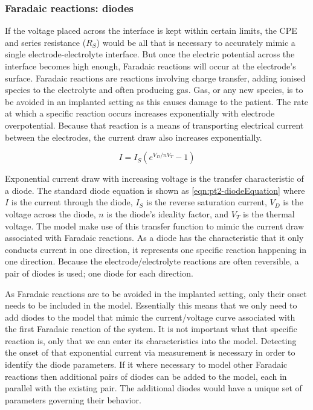     \subsubsection{Faradaic reactions: diodes}
      If the voltage placed across the interface is kept within certain limits, the CPE and series resistance ($R_{S}$) would be all that is necessary to accurately mimic a single electrode-electrolyte interface.
      But once the electric potential across the interface becomes high enough, Faradaic reactions will occur at the electrode's surface.
      Faradaic reactions are reactions involving charge transfer, adding ionised species to the electrolyte and often producing gas.
      Gas, or any new species, is to be avoided in an implanted setting as this causes damage to the patient.
      The rate at which a specific reaction occurs increases exponentially with electrode overpotential.
      Because that reaction is a means of transporting electrical current between the electrodes, the current draw also increases exponentially.

      \begin{equation}
        I = I_{S}\left( e^{V_{D}/n V_{T}} - 1\right)
        \label{eqn:pt2-diodeEquation}
      \end{equation}

      Exponential current draw with increasing voltage is the transfer characteristic of a diode.
      The standard diode equation is shown as \cref{eqn:pt2-diodeEquation} where $I$ is the current through the diode,
      $I_{S}$ is the reverse saturation current,
      $V_{D}$ is the voltage across the diode,
      $n$ is the diode's ideality factor,
      and $V_{T}$ is the thermal voltage.
      The model make use of this transfer function to mimic the current draw associated with Faradaic reactions.
      As a diode has the characteristic that it only conducts current in one direction, it represents one specific reaction happening in one direction.
      Because the electrode/electrolyte reactions are often reversible, a pair of diodes is used; one diode for each direction.

      As Faradaic reactions are to be avoided in the implanted setting, only their onset needs to be included in the model.
      Essentially this means that we only need to add diodes to the model that mimic the current/voltage curve associated with the first Faradaic reaction of the system.
      It is not important what that specific reaction is, only that we can enter its characteristics into the model.
      Detecting the onset of that exponential current via measurement is necessary in order to identify the diode parameters.
      If it where necessary to model other Faradaic reactions then additional pairs of diodes can be added to the model, each in parallel with the existing pair.
      The additional diodes would have a unique set of parameters governing their behavior.

